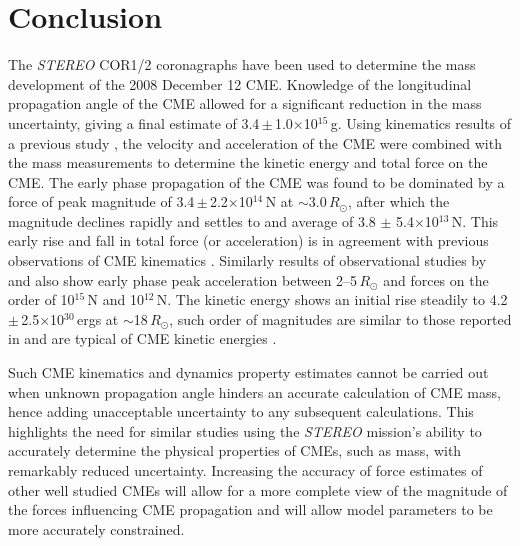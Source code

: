  \section{Conclusion} \label{bozomath}
 The \emph{STEREO} COR1/2 coronagraphs have been used to determine the mass development of the 2008 December 12 CME. Knowledge of the longitudinal propagation angle of the CME allowed for a significant reduction in the mass uncertainty, giving a final estimate of 3.4\,$\pm$\,1.0$\times$10$^{15}$\,g. Using kinematics results of a previous study \citep{byr10}, the velocity and acceleration of the CME were combined with the mass measurements to determine the kinetic energy and total force on the CME. The early phase propagation of the CME was found to be dominated by a force of peak magnitude of 3.4\,$\pm$\,2.2$\times$10$^{14}$\,N at $\sim$3.0\,$R_{\odot}$, after which the magnitude declines 
rapidly and settles to and average of 3.8 $\pm$ 5.4$\times$10$^{13}$\,N. This early rise and fall in total force (or acceleration) is in agreement with previous observations of CME kinematics \citep{gallagher03, bein2011}. Similarly results of observational studies by \citet{zhang2001} and \citet{zhang2004} also show early phase peak acceleration between 2--5\,$R_{\odot}$ and forces on the order of 10$^{15}$\,N and 10$^{12}$\,N. The kinetic energy shows an initial rise steadily to 4.2\,$\pm$\,2.5$\times$10$^{30}$\,ergs at $\sim$18\,$R_{\odot}$, such order of magnitudes are similar to those reported in \citet{vou00,emslie2004} and are typical of CME kinetic energies \citep{vour2010}.

Such CME kinematics and dynamics property estimates cannot be carried out when unknown propagation angle hinders an accurate calculation of CME mass, hence adding unacceptable uncertainty to any subsequent calculations. This highlights the need for similar studies using the \emph{STEREO} mission's ability to accurately determine the physical properties of CMEs, such as mass, with remarkably reduced uncertainty. Increasing the accuracy of force estimates of other well studied CMEs will allow for a more complete view of the magnitude of the forces influencing CME propagation and will allow model parameters to be more accurately constrained.





